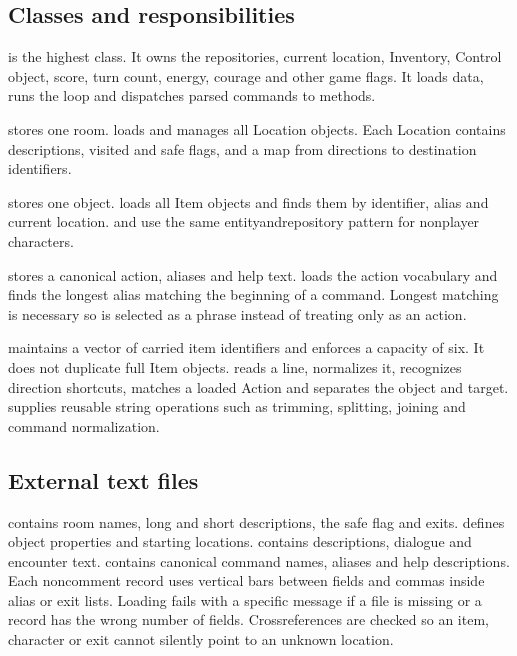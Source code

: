 \documentclass[letterpaper,10pt,english]{sphinxmanual}
\begin{document}
\subsection{Classes and responsibilities}
\label{\detokenize{AssignmentFour/main:classes-and-responsibilities}}
\sphinxAtStartPar
{} is the highest class. It owns the repositories, current location,
Inventory, Control object, score, turn count, energy, courage and other game
flags. It loads data, runs the loop and dispatches parsed commands to methods.

\sphinxAtStartPar
{} stores one room.  loads and manages all Location
objects. Each Location contains descriptions, visited and safe flags, and a map
from directions to destination identifiers.

\sphinxAtStartPar
{} stores one object.  loads all Item objects and finds them by
identifier, alias and current location.  and  use
the same entity\sphinxhyphen{}and\sphinxhyphen{}repository pattern for non\sphinxhyphen{}player characters.

\sphinxAtStartPar
{} stores a canonical action, aliases and help text.  loads
the action vocabulary and finds the longest alias matching the beginning of a
command. Longest matching is necessary so  is selected as a phrase
instead of treating only  as an action.

\sphinxAtStartPar
{} maintains a vector of carried item identifiers and enforces a
capacity of six. It does not duplicate full Item objects.  reads a
line, normalizes it, recognizes direction shortcuts, matches a loaded Action
and separates the object and target.  supplies reusable string
operations such as trimming, splitting, joining and command normalization.


\subsection{External text files}
\label{\detokenize{AssignmentFour/main:external-text-files}}
\sphinxAtStartPar
{} contains room names, long and short descriptions, the safe
flag and exits.  defines object properties and starting locations.
 contains descriptions, dialogue and encounter text.
 contains canonical command names, aliases and help descriptions.
Each non\sphinxhyphen{}comment record uses vertical bars between fields and commas inside
alias or exit lists. Loading fails with a specific message if a file is missing
or a record has the wrong number of fields. Cross\sphinxhyphen{}references are checked so an
item, character or exit cannot silently point to an unknown location.
\end{document}
